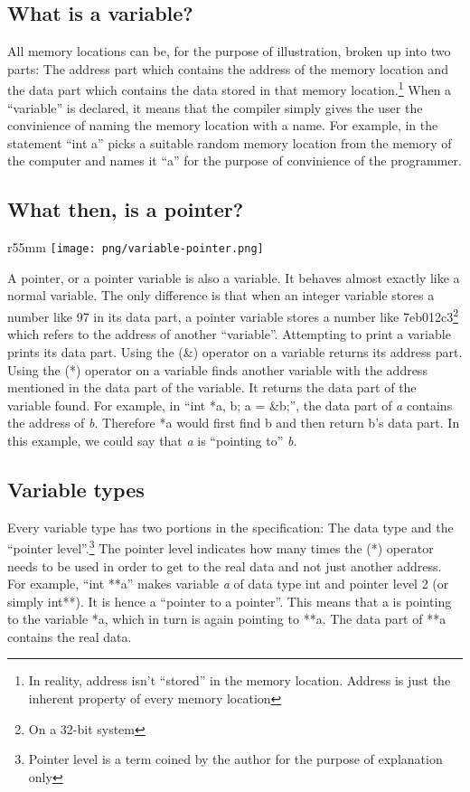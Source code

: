 \documentclass[10pt,twoside]{article}
\begin{document}
\subsection*{What is a variable?}
All memory locations can be, for the purpose of illustration, broken up into two
parts: The address part which contains the address of the memory location and
the data part which contains the data stored in that memory
location.\footnote{In reality, address isn't ``stored'' in the memory location.
Address is just the inherent property of every memory location} When a
``variable'' is declared, it means that the compiler simply gives the user the
convinience of naming the memory location with a name. For example, in the
statement ``int a'' picks a suitable random memory location from the memory of
the computer and names it ``a'' for the purpose of convinience of the
programmer.  \newpage \subsection*{What then, is a pointer?}

\begin{wrapfigure}{r}{55mm}
\texttt{[image: png/variable-pointer.png]}
\end{wrapfigure}

A pointer, or a pointer variable is also a variable. It behaves almost exactly
like a normal variable. The only difference is that when an integer variable
stores a number like 97 in its data part, a pointer variable stores a number
like 7eb012c3\footnote{On a 32-bit system} which refers to the address of
another ``variable''. Attempting to print a variable prints its data part. Using
the (\&) operator on a variable returns its address part. Using the (*) operator
on a variable finds another variable with the address mentioned in the data part
of the variable.  It returns the data part of the variable found. For example,
in ``int *a, b; a = \&b;'', the data part of \textit{a} contains the address of
\textit{b}. Therefore *a would first find b and then return b's data part. In
this example, we could say that \textit{a} is ``pointing to'' \textit{b}.
\subsection*{Variable types} Every variable type has two portions in the
specification: The data type and the ``pointer level''.\footnote{Pointer level
is a term coined by the author for the purpose of explanation only} The pointer
level indicates how many times the (*) operator needs to be used in order to get
to the real data and not just another address. For example, ``int **a'' makes
variable \textit{a} of data type int and pointer level 2 (or simply int**). It
is hence a ``pointer to a pointer''. This means that a is pointing to the
variable *a, which in turn is again pointing to **a. The data part of **a
contains the real data.
\end{document}
